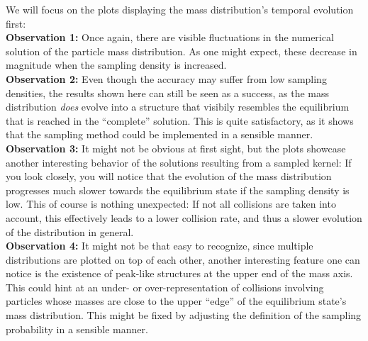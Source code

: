         We will focus on the plots displaying the mass distribution's temporal 
        evolution first: \\

        \textbf{Observation 1:} Once again, there are visible fluctuations in the numerical 
        solution of the particle mass distribution. As one might expect, these decrease in 
        magnitude when the sampling density is increased. \\

        \textbf{Observation 2:} Even though the accuracy may suffer from low sampling densities,
        the results shown here can still be seen as a success, as the mass distribution
        \textit{does} evolve into a structure that visibily resembles the equilibrium that is
        reached in the ``complete'' solution. This is quite satisfactory, as it shows that the 
        sampling method could be implemented in a sensible manner. \\

        \textbf{Observation 3:} It might not be obvious at first sight, but the plots showcase
        another interesting behavior of the solutions resulting from a sampled kernel: 
        If you look closely, you will notice that the evolution of the mass distribution 
        progresses much slower towards the equilibrium state if the sampling density is low. 
        This of course is nothing unexpected: If not all collisions are taken into account,
        this effectively leads to a lower collision rate, and thus a slower evolution 
        of the distribution in general. \\


        \textbf{Observation 4:} 
        It might not be that easy to recognize, since multiple distributions are plotted on 
        top of each other, another interesting feature one can notice is the existence 
        of peak-like structures at the upper end of the mass axis. 
        This could hint at an under- or over-representation of collisions involving particles 
        whose masses are close to the upper ``edge'' of the equilibrium state's mass distribution.
        This might be fixed by adjusting the definition of the sampling probability in a 
        sensible manner.
        \\
        

